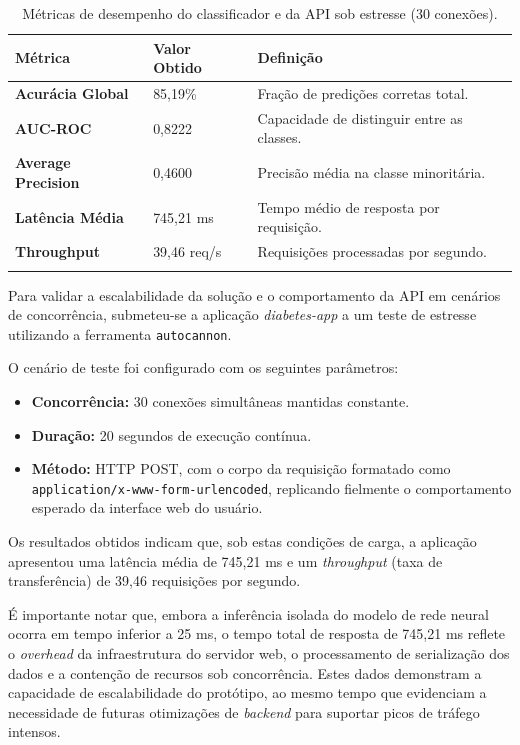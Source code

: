 \documentclass[
    12pt,
    article,
    oneside,
    a4paper,
    english,
    brazil
]{abntex2}
\begin{document}
\begin{longtable}[]{@{}lll@{}}
\toprule
Métrica & Valor Obtido & Definição \\
\midrule
\endhead
\textbf{Acurácia Global} & 85,19\% & Fração de predições corretas total. \\
\textbf{AUC-ROC} & 0,8222 & Capacidade de distinguir entre as classes. \\
\textbf{Average Precision} & 0,4600 & Precisão média na classe minoritária. \\
\textbf{Latência Média} & 745,21 ms & Tempo médio de resposta por requisição. \\
\textbf{Throughput} & 39,46 req/s & Requisições processadas por segundo. \\
\bottomrule
\caption{Métricas de desempenho do classificador e da API sob estresse (30 conexões).}
\end{longtable}


Para validar a escalabilidade da solução e o comportamento da API em cenários de concorrência, submeteu-se a aplicação \emph{diabetes-app} a um teste de estresse utilizando a ferramenta \texttt{autocannon}. 

O cenário de teste foi configurado com os seguintes parâmetros:
\begin{itemize}
    \item \textbf{Concorrência:} 30 conexões simultâneas mantidas constante.
    \item \textbf{Duração:} 20 segundos de execução contínua.
    \item \textbf{Método:} HTTP POST, com o corpo da requisição formatado como \texttt{application/x-www-form-urlencoded}, replicando fielmente o comportamento esperado da interface web do usuário.
\end{itemize}

Os resultados obtidos indicam que, sob estas condições de carga, a aplicação apresentou uma latência média de 745,21 ms e um \emph{throughput} (taxa de transferência) de 39,46 requisições por segundo. 

É importante notar que, embora a inferência isolada do modelo de rede neural ocorra em tempo inferior a 25 ms, o tempo total de resposta de 745,21 ms reflete o \emph{overhead} da infraestrutura do servidor web, o processamento de serialização dos dados e a contenção de recursos sob concorrência. Estes dados demonstram a capacidade de escalabilidade do protótipo, ao mesmo tempo que evidenciam a necessidade de futuras otimizações de \emph{backend} para suportar picos de tráfego intensos.
\end{document}
